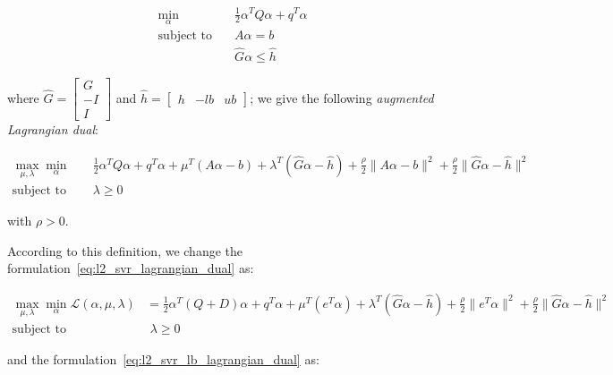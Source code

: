 \begin{equation}
    \begin{aligned}
        \min_{\alpha} \quad & \frac{1}{2} \alpha^T Q \alpha + q^T \alpha \\
            \textrm{subject to} \quad & A \alpha = b \\ & \hat{G} \alpha \leq \hat{h}
    \end{aligned}
\end{equation}

where $\hat{G} =
\begin{bmatrix}
 G \\
-I \\
 I 
\end{bmatrix}$ and $\hat{h} =
\begin{bmatrix}
h & -lb & ub
\end{bmatrix}$; we give the following \emph{augmented Lagrangian dual}:

\begin{equation} \label{eq:l2_svr_gen_aug_lagrangian_dual}
	\begin{aligned}
		    \max_{\mu,\lambda} \min_{\alpha} \quad & \frac{1}{2} \alpha^T Q \alpha + q^T \alpha + \mu^T (A \alpha - b) + \lambda^T (\hat{G} \alpha - \hat{h}) + \frac{\rho}{2} \| A \alpha - b \|^2 + \frac{\rho}{2} \| \hat{G} \alpha - \hat{h} \|^2 \\
    \text{subject to} \quad & \lambda \geq 0
	\end{aligned}
\end{equation}

with $\rho > 0$.

\bigskip

According to this definition, we change the formulation~\ref{eq:l2_svr_lagrangian_dual} as:

\begin{equation} \label{eq:l2_svr_aug_lagrangian_dual}
	\begin{aligned}
		    \max_{\mu,\lambda} \min_{\alpha} \mathcal{L}(\alpha,\mu,\lambda) &= \frac{1}{2} \alpha^T (Q + D) \alpha+q^T\alpha + \mu^T (e^T \alpha) + \lambda^T (\hat{G} \alpha - \hat{h}) + \frac{\rho}{2} \| e^T \alpha \|^2 + \frac{\rho}{2} \| \hat{G} \alpha - \hat{h} \|^2 \\
    \text{subject to} \quad & \,\, \lambda \geq 0
	\end{aligned}
\end{equation}

and the formulation~\ref{eq:l2_svr_lb_lagrangian_dual} as:

